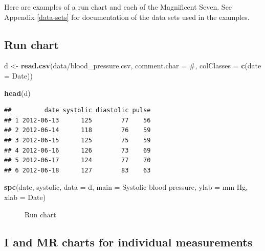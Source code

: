 \documentclass[
]{book}
\makeatletter
\newenvironment{Shaded}{\begin{snugshade}}{\end{snugshade}}
\newcommand{\AttributeTok}[1]{\textcolor[rgb]{0.13,0.29,0.53}{#1}}
\newcommand{\FunctionTok}[1]{\textcolor[rgb]{0.13,0.29,0.53}{\textbf{#1}}}
\newcommand{\NormalTok}[1]{#1}
\newcommand{\OtherTok}[1]{\textcolor[rgb]{0.56,0.35,0.01}{#1}}
\newcommand{\StringTok}[1]{\textcolor[rgb]{0.31,0.60,0.02}{#1}}
\newcommand*\pandocbounded[1]{%
  \sbox\pandoc@box{#1}%
  \Gscale@div\@tempa{\textheight}{\dimexpr\ht\pandoc@box+\dp\pandoc@box\relax}%
  \Gscale@div\@tempb{\linewidth}{\wd\pandoc@box}%
  \ifdim\@tempb\p@<\@tempa\p@\let\@tempa\@tempb\fi%
  \ifdim\@tempa\p@<\p@\scalebox{\@tempa}{\usebox\pandoc@box}%
  \else\usebox{\pandoc@box}%
  \fi%
}
\makeatother
\begin{document}
Here are examples of a run chart and each of the Magnificent Seven. See Appendix \ref{data-sets} for documentation of the data sets used in the examples.

\subsection{Run chart}\label{run-chart}

\begin{Shaded}
\begin{Highlighting}[]
\NormalTok{d }\OtherTok{\textless{}{-}} \FunctionTok{read.csv}\NormalTok{(}\StringTok{\textquotesingle{}data/blood\_pressure.csv\textquotesingle{}}\NormalTok{,}
              \AttributeTok{comment.char =} \StringTok{\textquotesingle{}\#\textquotesingle{}}\NormalTok{,}
              \AttributeTok{colClasses =} \FunctionTok{c}\NormalTok{(}\AttributeTok{date =} \StringTok{\textquotesingle{}Date\textquotesingle{}}\NormalTok{))}

\FunctionTok{head}\NormalTok{(d)}
\end{Highlighting}
\end{Shaded}

\begin{verbatim}
##         date systolic diastolic pulse
## 1 2012-06-13      125        77    56
## 2 2012-06-14      118        76    59
## 3 2012-06-15      125        75    59
## 4 2012-06-16      126        73    69
## 5 2012-06-17      124        77    70
## 6 2012-06-18      127        83    63
\end{verbatim}

\begin{Shaded}
\begin{Highlighting}[]
\FunctionTok{spc}\NormalTok{(date, systolic,}
    \AttributeTok{data =}\NormalTok{ d,}
    \AttributeTok{main =} \StringTok{\textquotesingle{}Systolic blood pressure\textquotesingle{}}\NormalTok{,}
    \AttributeTok{ylab =} \StringTok{\textquotesingle{}mm Hg\textquotesingle{}}\NormalTok{,}
    \AttributeTok{xlab =} \StringTok{\textquotesingle{}Date\textquotesingle{}}\NormalTok{)}
\end{Highlighting}
\end{Shaded}

\begin{figure}
\centering
\pandocbounded{}
\caption{\label{fig:rfun-run}Run chart}
\end{figure}

\subsection{I and MR charts for individual measurements}\label{i-and-mr-charts-for-individual-measurements}
\end{document}
